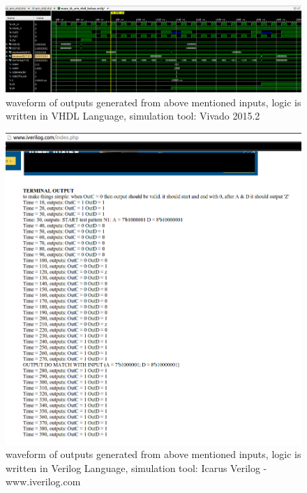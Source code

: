 \documentclass{article}
\begin{document}
\begin{figure}[H]
\centering
\includegraphics[width=\textwidth] {tb_vhdl.png}
\caption{waveform of outputs generated from above mentioned inputs, logic is written in VHDL Language, simulation tool: Vivado 2015.2}
\label{fig:tb_vhdl}
\end{figure}

\begin{figure}[H]
\centering
\includegraphics[width=\textwidth] {tb_iverilogcom.png}
\caption{waveform of outputs generated from above mentioned inputs, logic is written in Verilog Language, simulation tool: Icarus Verilog - www.iverilog.com}
\label{fig:tb_iverilogcom}
\end{figure}
\end{document}

